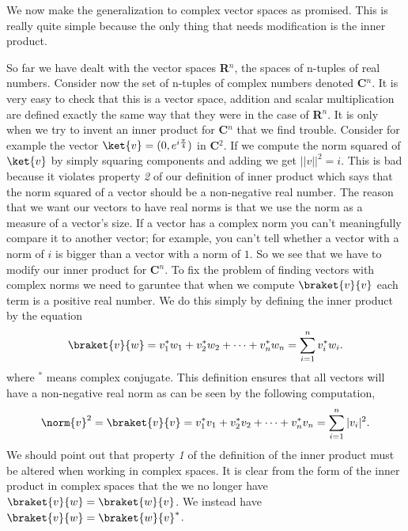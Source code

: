 We now make the generalization to complex vector spaces as promised.  This is really quite simple because the only thing that needs modification is the inner product.

So far we have dealt with the vector spaces \textbf{R}$^n$, the spaces of n-tuples of real numbers.  Consider now the set of n-tuples of complex numbers denoted \textbf{C}$^n$.  It is very easy to check that this is a vector space, addition and scalar multiplication are defined exactly the same way that they were in the case of \textbf{R}$^n$.  It is only when we try to invent an inner product for \textbf{C}$^n$ that we find trouble.  Consider for example the vector $\ket{v} = (0,e^{i\frac{\pi}{4}})$ in \textbf{C}$^2$.  If we compute the norm squared of $\ket{v}$ by simply squaring components and adding we get $||v||^2 = i$.  This is bad because it violates property \textit{2} of our definition of inner product which says that the norm squared of a vector should be a non-negative real number.  The reason that we want our vectors to have real norms is that we use the norm as a measure of a vector's size.  If a vector has a complex norm you can't meaningfully compare it to another vector; for example, you can't tell whether a vector with a norm of $i$ is bigger than a vector with a norm of $1$.  So we see that we have to modify our inner product for \textbf{C}$^n$.  To fix the problem of finding vectors with complex norms we need to garuntee that when we compute $\braket{v}{v}$ each term is a positive real number.  We do this simply by defining the inner product by the equation
\begin{displaymath} \braket{v}{w} = v_1^*w_1 + v_2^*w_2 + \cdots + v_n^*w_n = \sum_{i=1}^n v_i^*w_i. \end{displaymath}
where $^*$ means complex conjugate.  This definition ensures that all vectors will have a non-negative real norm as can be seen by the following computation,
\begin{displaymath} \norm{v}^2 = \braket{v}{v} = v_1^*v_1 + v_2^*v_2 + \cdots + v_n^*v_n = \sum_{i=1}^n |v_i|^2. \end{displaymath}
We should point out that property \textit{1} of the definition of the inner product must be altered when working in complex spaces.  It is clear from the form of the inner product in complex spaces that the we no longer have $\braket{v}{w} = \braket{w}{v}$.  We instead have $\braket{v}{w} = \braket{w}{v}^*$.

